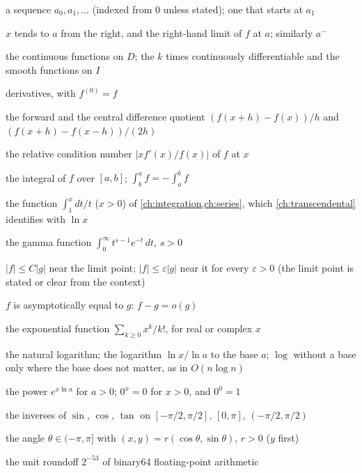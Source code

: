 \documentclass{sdbook-eng}
\begin{document}
\begin{symbols}
\item[$(a_n)$, $(a_n)_{n\ge1}$] a sequence $a_0,a_1,\ldots$ (indexed from $0$ unless stated); one that starts at $a_1$
\item[$x\to a^+$, $f(a^+)$] $x$ tends to $a$ from the right, and the right-hand limit of $f$ at $a$; similarly $a^-$
\item[$C(D)$, $C^k(I)$, $C^\infty(I)$] the continuous functions on $D$; the $k$ times continuously differentiable and the smooth functions on $I$
\item[$f'$, $f^{(n)}$, $df/dx$] derivatives, with $f^{(0)}=f$
\item[$D_h^+f(x)$, $D_h^0f(x)$] the forward and the central difference quotient $(f(x+h)-f(x))/h$ and $(f(x+h)-f(x-h))/(2h)$
\item[$\kappa_f(x)$] the relative condition number $|xf'(x)/f(x)|$ of $f$ at $x$
\item[$\int_a^bf$, $\int_a^bf(x)\,dx$] the integral of $f$ over $[a,b]$; $\int_b^af=-\int_a^bf$
\item[$\Lambda(x)$] the function $\int_1^x dt/t$ ($x>0$) of \cref{ch:integration,ch:series}, which \cref{ch:transcendental} identifies with $\ln x$
\item[$\Gamma(s)$] the gamma function $\int_0^\infty t^{s-1}e^{-t}\,dt$, $s>0$
\item[$f=O(g)$, $f=o(g)$] $|f|\le C|g|$ near the limit point; $|f|\le\varepsilon|g|$ near it for every $\varepsilon>0$ (the limit point is stated or clear from the context)
\item[$f\sim g$] $f$ is asymptotically equal to $g$: $f-g=o(g)$
\end{symbols}

\begin{symbols}
\item[$\exp x$, $e^x$] the exponential function $\sum_{k\ge0}x^k/k!$, for real or complex $x$
\item[$\ln x$, $\log_ax$] the natural logarithm; the logarithm $\ln x/\ln a$ to the base $a$; $\log$ without a base only where the base does not matter, as in $O(n\log n)$
\item[$a^x$] the power $e^{x\ln a}$ for $a>0$; $0^x=0$ for $x>0$, and $0^0=1$
\item[$\arcsin$, $\arccos$, $\arctan$] the inverses of $\sin$, $\cos$, $\tan$ on $[-\pi/2,\pi/2]$, $[0,\pi]$, $(-\pi/2,\pi/2)$
\item[$\operatorname{atan2}(y,x)$] the angle $\theta\in(-\pi,\pi]$ with $(x,y)=r(\cos\theta,\sin\theta)$, $r>0$ ($y$ first)
\item[$u$] the unit roundoff $2^{-53}$ of binary64 floating-point arithmetic
\end{symbols}
\end{document}
